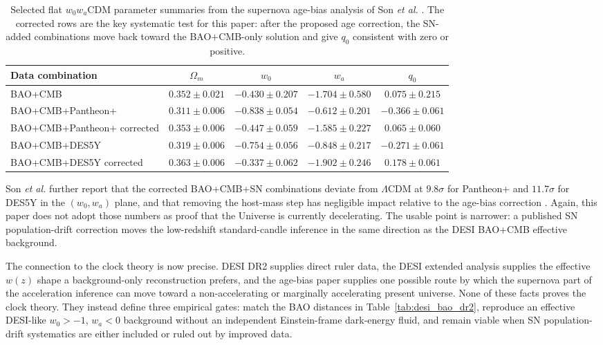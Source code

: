 \documentclass[aps,prd,reprint,nofootinbib,superscriptaddress,longbibliography]{revtex4-2}
\newcommand{\LCDM}{$\Lambda$CDM}
\begin{document}
\begin{table}[t]
\footnotesize
\caption{Selected flat $w_0w_a$CDM parameter summaries from the supernova age-bias analysis of Son \emph{et al.} \cite{Son2025}.  The corrected rows are the key systematic test for this paper: after the proposed age correction, the SN-added combinations move back toward the BAO+CMB-only solution and give $q_0$ consistent with zero or positive.}
\begin{ruledtabular}
\begin{tabular}{lcccc}
Data combination & $\Omega_m$ & $w_0$ & $w_a$ & $q_0$ \\
\hline
BAO+CMB & $0.352\pm0.021$ & $-0.430\pm0.207$ & $-1.704\pm0.580$ & $0.075\pm0.215$ \\
BAO+CMB+Pantheon+ & $0.311\pm0.006$ & $-0.838\pm0.054$ & $-0.612\pm0.201$ & $-0.366\pm0.061$ \\
BAO+CMB+Pantheon+ corrected & $0.353\pm0.006$ & $-0.447\pm0.059$ & $-1.585\pm0.227$ & $0.065\pm0.060$ \\
BAO+CMB+DES5Y & $0.319\pm0.006$ & $-0.754\pm0.056$ & $-0.848\pm0.217$ & $-0.271\pm0.061$ \\
BAO+CMB+DES5Y corrected & $0.363\pm0.006$ & $-0.337\pm0.062$ & $-1.902\pm0.246$ & $0.178\pm0.061$ \\
\end{tabular}
\end{ruledtabular}
\label{tab:son_agebias}
\end{table}

Son \emph{et al.} further report that the corrected BAO+CMB+SN combinations deviate from \LCDM{} at $9.8\sigma$ for Pantheon+ and $11.7\sigma$ for DES5Y in the $(w_0,w_a)$ plane, and that removing the host-mass step has negligible impact relative to the age-bias correction \cite{Son2025}.  Again, this paper does not adopt those numbers as proof that the Universe is currently decelerating.  The usable point is narrower: a published SN population-drift correction moves the low-redshift standard-candle inference in the same direction as the DESI BAO+CMB effective background.

The connection to the clock theory is now precise.  DESI DR2 supplies direct ruler data, the DESI extended analysis supplies the effective $w(z)$ shape a background-only reconstruction prefers, and the age-bias paper supplies one possible route by which the supernova part of the acceleration inference can move toward a non-accelerating or marginally accelerating present universe.  None of these facts proves the clock theory.  They instead define three empirical gates: match the BAO distances in Table~\ref{tab:desi_bao_dr2}, reproduce an effective DESI-like $w_0>-1$, $w_a<0$ background without an independent Einstein-frame dark-energy fluid, and remain viable when SN population-drift systematics are either included or ruled out by improved data.
\end{document}
